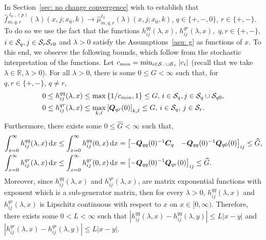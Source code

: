 In Section~\ref{sec: no change convergence} wish to establish that \(\widehat f_{m,q,r}^{\ell_0,(p)}(\lambda)(x,j;x_0,k)\to\widehat \mu_{m,q,r}^{\ell_0}(\lambda)(x,j;x_0,k)\), \(q\in\{+,-,0\}\), \(r\in\{+,-\}\). To do so we use the fact that the functions \(h_{ij}^{qq}(\lambda,x),\,h_{ij}^{qr}(\lambda,x),\) \(q,r\in\{+,-\},\) \(i\in\mathcal{S}_q,j\in\mathcal S_r\mathcal{S}_{r0}\) and \(\lambda>0\) satisfy the Assumptions~\ref{asu: g} as functions of \(x\). To this end, we observe the following bounds, which follow from the stochastic interpretation of the functions. Let \(c_{min}=\min_{i\in\mathcal S_-\cup\mathcal{S}_+} |c_i|\) (recall that we take \(\lambda\in\mathbb R, \lambda >0\)). For all \(\lambda > 0\), there is some \(0\leq G<\infty\) such that, for \(q,r\in\{+,-\},\, q\neq r\),  
\begin{align*}
	0\leq h_{ij}^{qq}(\lambda,x) &\leq   \max\left\{1/c_{min},1\right\}\leq G,\, i\in\mathcal S_q,j\in\mathcal{S}_q\cup\mathcal S_{q0},
	\\0\leq  h_{ij}^{qr}(\lambda,x)  &  \leq \max_{k,\ell}\left[\boldsymbol{Q}_{qr}(0)\right]_{k,\ell}\leq G, \, i\in\mathcal S_q,\, j\in\mathcal S_r.
\end{align*}
Furthermore, there exists some \(0\leq \widehat G<\infty\) such that, 
\begin{align*}
	\int_{x=0}^\infty  h_{ij}^{qq}(\lambda,x) \, \mathrm{d} x &\leq \int_{x=0}^\infty  h_{ij}^{qq}(0,x) \, \mathrm{d} x = \begin{bmatrix} -\boldsymbol{Q}_{qq}(0)^{-1}\boldsymbol{C}_q & -\boldsymbol Q_{qq}(0)^{-1}\boldsymbol Q_{q0}(0) \end{bmatrix}_{ij}\leq \widehat G, 
	\\\int_{x=0}^\infty  h_{ij}^{qr}(\lambda,x) \, \mathrm{d} x &\leq \int_{x=0}^\infty  h_{ij}^{qr}(0,x) \, \mathrm{d} x = \left[-\boldsymbol{Q}_{qq}(0)^{-1}\boldsymbol{Q}_{qr}(0)\right]_{ij}\leq \widehat G.
\end{align*}
Moreover, since \(h_{ij}^{qq}(\lambda,x)\) and \(h_{ij}^{qr}(\lambda,x)\), are matrix exponential functions with exponent which is a sub-generator matrix, then for every \(\lambda >0\), \(h_{ij}^{qq}(\lambda,x)\) and \(h_{ij}^{qr}(\lambda,x)\) is Lipschitz continuous with respect to \(x\) on \(x\in[0,\infty)\). Therefore, there exists some \(0<L<\infty\) such that \(\left|h_{ij}^{qq}(\lambda,x)-h_{ij}^{qq}(\lambda,y)\right|\leq L|x-y|\) and \(\left|h_{ij}^{qr}(\lambda,x)-h_{ij}^{qr}(\lambda,y)\right|\leq L|x-y|.\)

